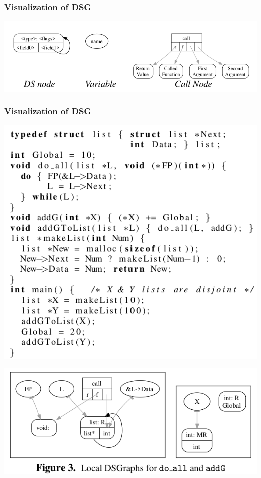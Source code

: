 \documentclass[aspectratio=1610, 13pt]{beamer}
\begin{document}
\begin{frame}\frametitle{Visualization of DSG}
\begin{center}
\includegraphics[scale=0.50]{dsg_legend.png}
\end{center}
\end{frame}

\begin{frame}\frametitle{Visualization of DSG}

\begin{center}
\includegraphics[scale=0.3]{code.png}

\includegraphics[scale=0.4]{doall.png}
\end{center}
\end{frame}
\end{document}
